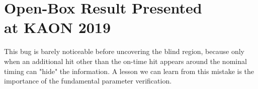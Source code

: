 
\chapter[Open-Box Result Presented at KAON 2019]{Open-Box Result Presented \\[0.5em] at KAON 2019} %

\label{AppendixA} %

% 
%

This bug is barely noticeable before uncovering the blind region, because only when an additional hit other than the on-time hit appears around the nominal timing can "hide" the information. A lesson we can learn from this mistake is the importance of the fundamental parameter verification.